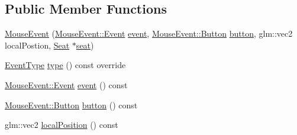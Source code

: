 \subsection*{Public Member Functions}
\begin{DoxyCompactItemize}
\item 
\hyperlink{classmotorcar_1_1MouseEvent_ac29d5c7d5c7e4176828f2b671458c25b}{Mouse\-Event} (\hyperlink{classmotorcar_1_1MouseEvent_a2d063fb053a90c196b58c1dec4d989aa}{Mouse\-Event\-::\-Event} \hyperlink{classmotorcar_1_1MouseEvent_a52d0060d0793eab0ca6aad7f69d78fda}{event}, \hyperlink{classmotorcar_1_1MouseEvent_aeb5515c2434123ce2f897f8fc89effae}{Mouse\-Event\-::\-Button} \hyperlink{classmotorcar_1_1MouseEvent_a6682d4092f940335170806435e3bb6fe}{button}, glm\-::vec2 local\-Postion, \hyperlink{classmotorcar_1_1Seat}{Seat} $\ast$\hyperlink{classmotorcar_1_1Event_a7426828c8402193cac63a7b3fda5a17e}{seat})
\item 
\hyperlink{classmotorcar_1_1Event_af4f5d9ed7dc2d8a2324fa5b0d32c29b0}{Event\-Type} \hyperlink{classmotorcar_1_1MouseEvent_afb419c29a7d2fa6dd429eeb3ac0699c5}{type} () const override
\item 
\hyperlink{classmotorcar_1_1MouseEvent_a2d063fb053a90c196b58c1dec4d989aa}{Mouse\-Event\-::\-Event} \hyperlink{classmotorcar_1_1MouseEvent_a52d0060d0793eab0ca6aad7f69d78fda}{event} () const 
\item 
\hyperlink{classmotorcar_1_1MouseEvent_aeb5515c2434123ce2f897f8fc89effae}{Mouse\-Event\-::\-Button} \hyperlink{classmotorcar_1_1MouseEvent_a6682d4092f940335170806435e3bb6fe}{button} () const 
\item 
glm\-::vec2 \hyperlink{classmotorcar_1_1MouseEvent_aaadbd8608dd2e0ed6d3836f0947f2141}{local\-Position} () const 
\end{DoxyCompactItemize}


